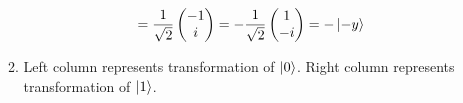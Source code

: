 \documentclass[12pt]{article}
\begin{document}
\begin{enumerate}[font=\bfseries]
\begin{enumerate}
\[                                        =
                                        \frac{1}{\sqrt{2}}
                                        \begin{pmatrix}
                                        -1 \\ i
                                        \end{pmatrix}
                                        =
                                        -\frac{1}{\sqrt{2}}
                                        \begin{pmatrix}
                                        1 \\ -i
                                        \end{pmatrix}
                                        =
                                        -\ket{-y}
                    \]
            \item Left column represents transformation of $\ket{0}$. Right column represents transformation of $\ket{1}$.
        \end{enumerate}
\end{enumerate}
\end{document}
